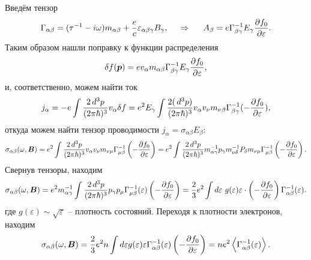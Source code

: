 Введём тензор 
\begin{equation*}
	\Gamma_{\alpha \beta} = (\tau^{-1} - i \omega) m_{\alpha \beta} + \frac{e}{c} \varepsilon_{\alpha \beta \gamma} B_\gamma,
	\hspace{0.5cm} \Rightarrow \hspace{0.5cm}
	A_\beta = e \Gamma_{\beta \gamma}^{-1} E_\gamma \frac{\partial f_0}{\partial \varepsilon}.
\end{equation*}
Таким образом нашли поправку к функции распределения
\begin{equation*}
	\delta f (\boldsymbol{p}) = e v_\alpha m_{\alpha \beta} \Gamma^{-1}_{\beta \gamma} E_\gamma \frac{\partial f_0}{\partial \varepsilon},
\end{equation*}
и, соответственно, можем найти ток
\begin{equation*}
	j_\alpha = - e \int \frac{2 \, d^3 p}{(2 \pi \hbar)^3} v_\alpha \delta f = e^2 E_\gamma \int \frac{2 (\, d^3 p)}{(2 \pi \hbar)^3} v_\alpha v_\nu m_{\nu \beta} \Gamma^{-1}_{\beta \gamma} (- \frac{\partial f_0}{\partial \varepsilon} ),
\end{equation*}
откуда можем найти тензор проводимости $j_\alpha = \sigma_{\alpha \beta} E_\beta$:
\begin{equation*}
	\sigma_{\alpha \beta}(\omega, \boldsymbol{B}) = e^2 \int \frac{2 \, d^3 p}{(2 \pi \hbar)^3} v_\alpha v_\nu m_{\nu \mu} \Gamma^{-1}_{\mu \beta} \left(
		- \frac{\partial f_0}{\partial \varepsilon} 
	\right) = e^2 \int \frac{2 \, d^3 p}{(2 \pi \hbar)^3} m_{\alpha \gamma}^{-1} p_\gamma m_{\nu \delta}^{-1} P_\delta m_{\nu \mu} \Gamma_{\mu \beta}^{-1} 
	\left(- \frac{\partial f_0}{\partial \varepsilon} \right)
	.
\end{equation*}
Свернув тензоры, находим
\begin{equation*}
	\sigma_{\alpha \beta} (\omega, \boldsymbol{B}) = e^2 m_{\alpha \gamma}^{-1} 
	\int \frac{2 \, d^3 p}{(2 \pi \hbar)^3} p_\gamma p_\mu \Gamma_{\mu \beta}^{-1} (\varepsilon) \left(-\frac{\partial f_0}{\partial \varepsilon} \right) = 
	\frac{2}{3} e^2 \int d \varepsilon\ g(\varepsilon) \varepsilon \cdot \left(- \frac{\partial f_0}{\partial \varepsilon} \right) \Gamma_{\alpha \beta}^{-1} (\varepsilon).
\end{equation*}
где $g(\varepsilon) \sim \sqrt{ \varepsilon}$ -- плотность  состояний.  Переходя к плотности электронов, находим
\begin{equation*}
	\sigma_{\alpha \beta} (\omega, \boldsymbol{B}) =  \frac{2}{3} e^2 n \int d \varepsilon g(\varepsilon) \varepsilon \Gamma_{\alpha \beta}^{-1} (\varepsilon) \left(- \frac{\partial f_0}{\partial \varepsilon} \right) = n e^2 \left\langle \Gamma_{\alpha \beta}^{-1} (\varepsilon)\right\rangle.
\end{equation*}
